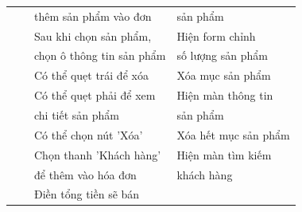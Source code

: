 \documentclass[../DoAn.tex]{subfiles}
\begin{document}
\begin{table}[H]
\begin{tabular}{|l|c|l|l|}
                                                 &                                                                         & thêm sản phẩm vào đơn                     & sản phẩm                                        \\ \cline{3-4}
                                                 &                                                                         & Sau khi chọn sản phẩm,                    & Hiện form chỉnh                                 \\
                                                 &                                                                         & chọn ô thông tin sản phẩm                 & số lượng sản phẩm                               \\ \cline{3-4}
                                                 &                                                                         & Có thể quẹt trái để xóa                   & Xóa mục sản phẩm                                \\ \cline{3-4}
                                                 &                                                                         & Có thể quẹt phải để xem                   & Hiện màn thông tin                              \\
                                                 &                                                                         & chi tiết sản phẩm                         & sản phẩm                                        \\ \cline{3-4}
                                                 &                                                                         & Có thể chọn nút 'Xóa'                     & Xóa hết mục sản phẩm                            \\ \cline{3-4}
                                                 &                                                                         & Chọn thanh 'Khách hàng'                   & Hiện màn tìm kiếm                               \\
                                                 &                                                                         & để thêm vào hóa đơn                       & khách hàng                                      \\ \cline{3-4}
                                                 &                                                                         & Điền tổng tiền sẽ bán                     &                                                 \\

\end{tabular}
\end{table}
\end{document}
